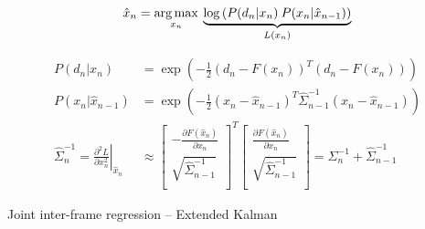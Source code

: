 \begin{algorithm}
\begin{equation*}
\begin{aligned}
\hat{x}_n &= \operatorname*{arg\,max}_{x_n} \:
\underbrace{\log \left( P(d_n|x_n) \: P(x_n |\hat{x}_{n - 1}) \right)}_{L(x_n)}   
\\
\end{aligned}
\end{equation*}

\begin{equation*}
\begin{aligned}
P(d_n|x_n) &= \exp \left( -\tfrac{1}{2} (d_n - F(x_n))^T (d_n - F(x_n)) \right)
\\
P(x_n |\hat{x}_{n - 1}) &= \exp \left( -\tfrac{1}{2}(x_n - \hat{x}_{n - 1})^T \hat{\Sigma}_{n - 1}^{-1} (x_n - \hat{x}_{n - 1})\right)
\\
\hat{\Sigma}_n^{-1} = 
\left.\tfrac{\partial^2 L}{\partial x_n^2}\right|_{\hat{x}_n} &\approx 
\left[
	\begin{array}{cc}
		- \tfrac{\partial F(\hat{x}_n)} {\partial x_n} \\
		\sqrt{\hat{\Sigma}_{n - 1}^{-1}} \\
	\end{array}
\right]^T 
\left[
	\begin{array}{c}
		\tfrac{\partial F(\hat{x}_n)} {\partial x_n} \\
		\sqrt{\hat{\Sigma}_{n - 1}^{-1}} \\
	\end{array}
\right] 
= \Sigma_{n}^{-1} + \hat{\Sigma}_{n-1}^{-1}  
\end{aligned}
\end{equation*}
\caption{Joint inter-frame regression -- Extended Kalman}
\label{alg:interframeplus}
\label{alg:iekf-like}
\label{tab:iekf-like}
\end{algorithm}

